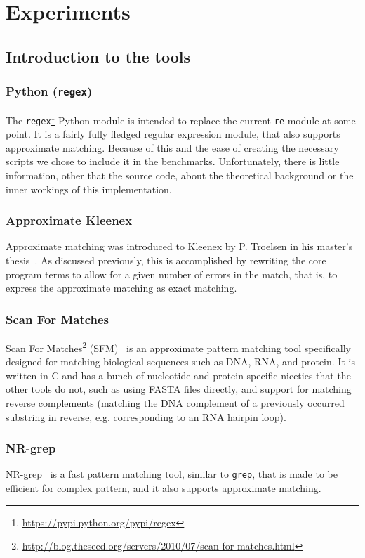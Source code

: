 \section{Experiments}

\subsection{Introduction to the tools}
\subsubsection{Python (\texttt{regex})}
The \texttt{regex}\footnote{\url{https://pypi.python.org/pypi/regex}} Python
module is intended to replace the current \texttt{re} module at some point. It
is a fairly fully fledged regular expression module, that also supports
approximate matching. Because of this and the ease of creating the necessary
scripts we chose to include it in the benchmarks. Unfortunately, there is
little information, other that the source code, about the theoretical
background or the inner workings of this implementation.

\subsubsection{Approximate Kleenex}
Approximate matching was introduced to Kleenex by P. Troelsen in his master's
thesis~\cite{troelsen2016approximate}. As discussed previously, this is
accomplished by rewriting the core program terms to allow for a given number of
errors in the match, that is, to express the approximate matching as exact
matching.

\subsubsection{Scan For Matches}
Scan For Matches\footnote{\url{http://blog.theseed.org/servers/2010/07/scan-for-matches.html}}
(SFM)~\cite{dsouza1997searching} is an approximate pattern matching tool
specifically designed for matching biological sequences such as DNA, RNA, and
protein. It is written in C and has a bunch of nucleotide and protein specific
niceties that the other tools do not, such as using FASTA files directly, and
support for matching reverse complements (matching the DNA complement of a
previously occurred substring in reverse, e.g. corresponding to an RNA hairpin
loop).

\subsubsection{NR-grep}
NR-grep~\cite{navarro2001nr} is a fast pattern matching tool, similar to
\texttt{grep}, that is made to be efficient for complex pattern, and it also
supports approximate matching.

